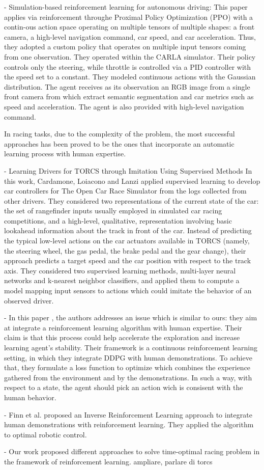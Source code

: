 - Simulation-based reinforcement learning for autonomous driving:
This paper applies via reinforcement throughe Proximal Policy Optimization (PPO) with a contin-ous action space operating on multiple tensors of multiple shapes: a front camera, a high-level navigation command, car speed, and car acceleration. Thus, they adopted a custom policy that operates on multiple input tensors coming from one observation. They operated within the CARLA simulator. Their policy controls only the steering, while throttle is controlled via a PID controller with the speed set to a constant.
They modeled continuous actions with the Gaussian distribution.
The agent receives as its observation an RGB image from a single front camera from which extract semantic segmentation and car metrics such as speed and acceleration. The agent is also provided with high-level navigation command. 

In racing tasks, due to the complexity of the problem, the most successful approaches has been proved to be the ones that incorporate an automatic learning process with human expertise.

- Learning Drivers for TORCS through Imitation Using Supervised Methods	
In this work, Cardamone, Loiacono and Lanzi applied supervised learning to develop car controllers for The Open Car Race Simulator from the logs collected from other drivers. 
They considered two representations of the current state of the car: the set of rangefinder inputs usually employed in simulated car racing competitions, and a high-level, qualitative, representation involving basic lookahead information about the track in front of the car. Instead of predicting the typical low-level actions on the car actuators available in TORCS (namely, the steering wheel, the gas pedal, the brake pedal and the gear change), their approach predicts a target speed and the car position with respect to the track axis.
They considered two supervised learning methods, multi-layer neural networks and k-nearest neighbor classifiers, and applied them to compute a model mapping input sensors to actions which could imitate the behavior of an observed driver.

- In this paper \cite{cinesi}, the authors addresses an issue which is similar to ours: they aim at integrate a reinforcement learning algorithm with human expertise. Their claim is that this process could help accelerate the exploration and increase learning agent's stability.
Their framework is a continuous reinforcement learning setting, in which they integrate DDPG with human demonstrations.
To achieve that, they formulate a loss function to optimize which combines the experience gathered from the environment and by the demonstrations. In such a way, with respect to a state, the agent should pick an action wich is consisent with the human behavior.

- Finn et al. proposed an Inverse Reinforcement Learning \cite{inverse} approach to integrate human demonstrations with reinforcement learning. They applied the algorithm to optimal robotic control.



- Our work proposed different approaches to solve time-optimal racing problem in the framework of reinforcement learning. ampliare, parlare di torcs